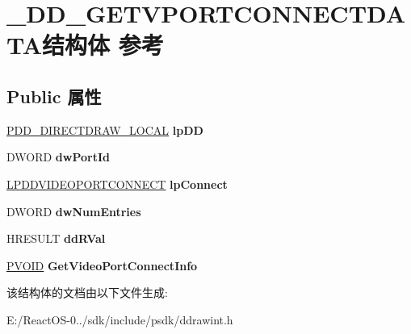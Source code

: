\hypertarget{struct___d_d___g_e_t_v_p_o_r_t_c_o_n_n_e_c_t_d_a_t_a}{}\section{\+\_\+\+D\+D\+\_\+\+G\+E\+T\+V\+P\+O\+R\+T\+C\+O\+N\+N\+E\+C\+T\+D\+A\+T\+A结构体 参考}
\label{struct___d_d___g_e_t_v_p_o_r_t_c_o_n_n_e_c_t_d_a_t_a}
\subsection*{Public 属性}
\begin{DoxyCompactItemize}
\item 
\mbox{\label{struct___d_d___g_e_t_v_p_o_r_t_c_o_n_n_e_c_t_d_a_t_a_ac0cf411809c0690536aa887cbbf7b876}} 
\hyperlink{struct___d_d___d_i_r_e_c_t_d_r_a_w___l_o_c_a_l}{P\+D\+D\+\_\+\+D\+I\+R\+E\+C\+T\+D\+R\+A\+W\+\_\+\+L\+O\+C\+AL} {\bfseries lp\+DD}
\item 
\mbox{\label{struct___d_d___g_e_t_v_p_o_r_t_c_o_n_n_e_c_t_d_a_t_a_a90835741a82c9036950c23f22932265d}} 
D\+W\+O\+RD {\bfseries dw\+Port\+Id}
\item 
\mbox{\label{struct___d_d___g_e_t_v_p_o_r_t_c_o_n_n_e_c_t_d_a_t_a_ad9637bd8f552a64685007121dd71403f}} 
\hyperlink{struct___d_d_v_i_d_e_o_p_o_r_t_c_o_n_n_e_c_t}{L\+P\+D\+D\+V\+I\+D\+E\+O\+P\+O\+R\+T\+C\+O\+N\+N\+E\+CT} {\bfseries lp\+Connect}
\item 
\mbox{\label{struct___d_d___g_e_t_v_p_o_r_t_c_o_n_n_e_c_t_d_a_t_a_a9d1ad58210b23b6527cec9c688415ca4}} 
D\+W\+O\+RD {\bfseries dw\+Num\+Entries}
\item 
\mbox{\label{struct___d_d___g_e_t_v_p_o_r_t_c_o_n_n_e_c_t_d_a_t_a_a864f29701412caf9fd777beb015080c9}} 
H\+R\+E\+S\+U\+LT {\bfseries dd\+R\+Val}
\item 
\mbox{\label{struct___d_d___g_e_t_v_p_o_r_t_c_o_n_n_e_c_t_d_a_t_a_a0adb802099a024c92c85fff0f20c4275}} 
\hyperlink{interfacevoid}{P\+V\+O\+ID} {\bfseries Get\+Video\+Port\+Connect\+Info}
\end{DoxyCompactItemize}


该结构体的文档由以下文件生成\+:\begin{DoxyCompactItemize}
\item 
E\+:/\+React\+O\+S-\/0../sdk/include/psdk/ddrawint.\+h\end{DoxyCompactItemize}
